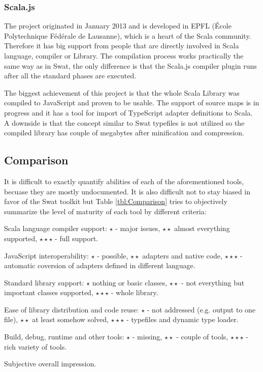 \documentclass[12pt,a4paper]{report}
\begin{document}
\subsubsection*{Scala.js}

The project originated in January 2013 and is developed in EPFL (École Polytechnique Fédérale de Lausanne), which is a heart of the Scala community. Therefore it has big support from people that are directly involved in Scala language, compiler or Library. The compilation process works practically the same way as in Swat, the only difference is that the Scala.js compiler plugin runs after all the standard phases are executed.

The biggest achievement of this project is that the whole Scala Library was compiled to JavaScript and proven to be usable. The support of source maps is in progress and it has a tool for import of TypeScript adapter definitions to Scala. A downside is that the concept similar to Swat typefiles is not utilized so the compiled library has couple of megabytes after minification and compression.

\subsection{Comparison}

It is difficult to exactly quantify abilities of each of the aforementioned tools, becuase they are mostly undocumented. It is also difficult not to stay biased in favor of the Swat toolkit but Table \ref{tbl:Comparison} tries to objectively summarize the level of maturity of each tool by different criteria:

\begin{description}[style=multiline,leftmargin=5cm]
\item[Compiler] Scala language compiler support: $\star$ - major issues, $\star\star$ almost everything supported, $\star\star\star$ - full support.
\item[Interoperability] JavaScript interoperability: $\star$ - possible, $\star\star$ adapters and native code, $\star\star\star$ - automatic coversion of adapters defined in different language.
\item[Libraries] Standard library support: $\star$ nothing or basic classes, $\star\star$ - not everything but important classes supported, $\star\star\star$ - whole library.
\item[Distribution] Ease of library distribution and code reuse: $\star$ - not addressed (e.g. output to one file), $\star\star$ at least somehow solved, $\star\star\star$ - typefiles and dynamic type loader.
\item[Tooling] Build, debug, runtime and other tools: $\star$ - missing, $\star\star$ - couple of tools, $\star\star\star$ - rich variety of tools.
\item[Overall] Subjective overall impression.
\end{description}
\end{document}
